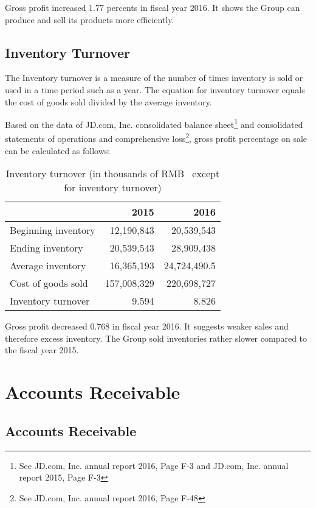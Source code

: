 Gross profit increased 1.77 percents in fiscal year 2016. It shows the Group can produce and sell its products more efficiently. 


\subsection{Inventory Turnover}

The Inventory turnover is a measure of the number of times inventory is sold or used in a time period such as a year. The equation for inventory turnover equals the cost of goods sold divided by the average inventory.

Based on the data of JD.com, Inc. consolidated balance sheet\footnote{See JD.com, Inc. annual report 2016, Page F-3 and JD.com, Inc. annual report 2015, Page F-3} and consolidated statements of operations and comprehensive loss\footnote{See JD.com, Inc. annual report 2016, Page F-48}, gross profit percentage on sale can be calculated as follows:

\begin{table}[H]	
	\begin{center}
		\begin{tabular}{lrr}
			\toprule
			&\textbf{2015}&\textbf{2016}\\
			\midrule
			Beginning inventory &12,190,843&20,539,543\\
			Ending inventory  &20,539,543&28,909,438\\
			Average inventory &16,365,193&24,724,490.5\\
			Cost of goods sold &157,008,329&220,698,727\\
			Inventory turnover &9.594&8.826\\
			\bottomrule
		\end{tabular}
	\end{center}
	\caption{Inventory turnover (in thousands of RMB \textyen\ except for inventory turnover)}\label{table:1}
\end{table}


Gross profit decreased 0.768 in fiscal year 2016. It suggests weaker sales and therefore excess inventory. The Group sold inventories rather slower compared to the fiscal year 2015. 

\section{Accounts Receivable}
\subsection{Accounts Receivable}

